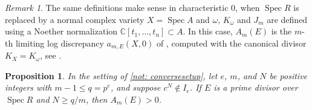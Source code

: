 \documentclass[11pt,leqno]{amsart}
\numberwithin{equation}{section}
\newtheorem{proposition}[theorem]{Proposition}
\theoremstyle{definition}
\theoremstyle{remark}
\newtheorem{remark}[theorem]{Remark}
\newcommand{\C}{\mathbb{C}}
\newcommand{\Spec}{\operatorname{Spec}}
\begin{document}
\begin{remark} \label{rem: dFH}
The same definitions make sense in characteristic $0$, when $\Spec R$ is replaced by a normal complex variety $X = \Spec A$ and $\omega$, $K_\omega$ and $J_m$ are defined using a Noether normalization $\C[t_1, \dots, t_n] \subset A$. In this case, $A_m(E)$ is the $m$-th limiting log discrepancy $a_{m, E}(X, 0)$ of \cite[Definition 7.1]{dFH09}, computed with the canonical divisor $K_X = K_\omega$, see \cite[Definitions 2.6, 3.1, and 7.1]{dFH09}.
\end{remark}


\begin{proposition} \label{prop: discrepancybound}
 In the setting of \cref{not: conversesetup}, let $e$, $m$, and $N$ be positive integers with $m - 1 \leq q = p^e$, and suppose $c^N \notin I_e$. If $E$ is a prime divisor over $\Spec R$ and $N \geq q/m$, then $A_m(E) > 0$.
\end{proposition}
\end{document}
